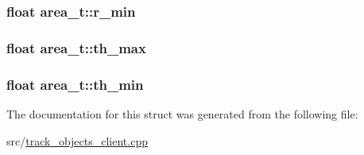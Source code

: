 \subsubsection[{\texorpdfstring{r\+\_\+min}{r_min}}]{\setlength{\rightskip}{0pt plus 5cm}float area\+\_\+t\+::r\+\_\+min}\hypertarget{structarea__t_ab7462395e064eec625efb60399ffd7dd}{}\label{structarea__t_ab7462395e064eec625efb60399ffd7dd}
\subsubsection[{\texorpdfstring{th\+\_\+max}{th_max}}]{\setlength{\rightskip}{0pt plus 5cm}float area\+\_\+t\+::th\+\_\+max}\hypertarget{structarea__t_a0e7df586bb9df7e6d28bf3f9bbe32ca0}{}\label{structarea__t_a0e7df586bb9df7e6d28bf3f9bbe32ca0}
\subsubsection[{\texorpdfstring{th\+\_\+min}{th_min}}]{\setlength{\rightskip}{0pt plus 5cm}float area\+\_\+t\+::th\+\_\+min}\hypertarget{structarea__t_a930a0c418008eb2f369737fd97c75b3d}{}\label{structarea__t_a930a0c418008eb2f369737fd97c75b3d}


The documentation for this struct was generated from the following file\+:\begin{DoxyCompactItemize}
\item 
src/\hyperlink{track__objects__client_8cpp}{track\+\_\+objects\+\_\+client.\+cpp}\end{DoxyCompactItemize}
